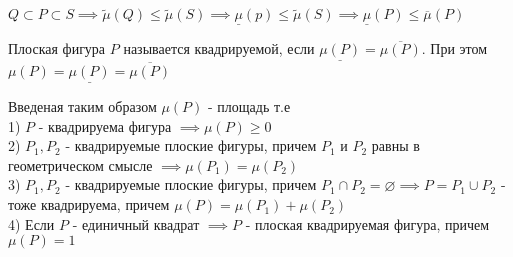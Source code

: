 \documentclass[../main.tex]{subfiles}
\begin{document}
$Q\subset P \subset S \implies \tilde{\mu}(Q)\leqslant \tilde{\mu}(S)\implies \underline{\mu}(p)\leqslant \tilde{\mu}(S)\implies \underline{\mu}(P)\leqslant \overline{\mu}(P)$

\begin{definition}
    Плоская фигура $P$ называется квадрируемой, если $\underline{\mu(P)}=\overline{\mu(P)}.$ При этом $\mu(P)=\underline{\mu(P)}=\overline{\mu(P)}$
\end{definition}

\begin{theorem}
    Введеная таким образом $\mu(P)$ - площадь т.е 
    \\1) $P$ - квадрируема фигура $\implies \mu (P)\geqslant 0$
    \\2) $P_{1},P_{2}$ - квадрируемые плоские фигуры, причем $P_{1}$ и $P_{2}$ равны в геометрическом смысле $\implies \mu(P_{1})=\mu(P_{2}) $
    \\3) $P_{1},P_{2}$ - квадрируемые плоские фигуры, причем $P_{1} \cap P_{2} = \varnothing \implies P=P_{1}\cup P_{2}$ - тоже квадрируема, причем $\mu(P)=\mu(P_{1})+\mu(P_{2})$
    \\4) Если $P$ - единичный квадрат $\implies P$ - плоская квадрируемая фигура, причем $\mu(P)=1$ 

\end{theorem}
\end{document}
